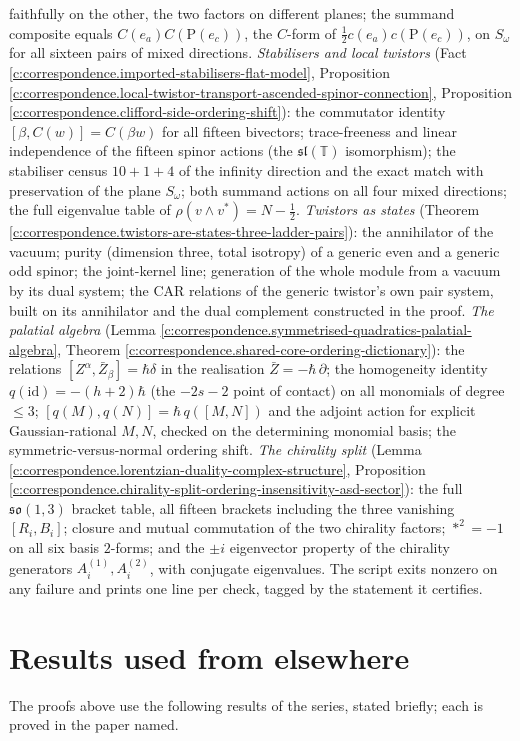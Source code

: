 \documentclass[11pt]{article}
\theoremstyle{definition}
\theoremstyle{plain}
\providecommand{\Som}{}\renewcommand{\Som}{S_\omega}
\providecommand{\T}{}\renewcommand{\T}{\mathbb{T}}
\begin{document}
faithfully on the other, the two factors on different planes; the summand composite equals $C(e_a)C(\mathrm{P}(e_c))$, the $C$-form of $\tfrac12 c(e_a)c(\mathrm{P}(e_c))$, on $\Som$ for all sixteen pairs of mixed directions. \emph{Stabilisers and local twistors} (Fact \ref{c:correspondence.imported-stabilisers-flat-model}, Proposition \ref{c:correspondence.local-twistor-transport-ascended-spinor-connection}, Proposition \ref{c:correspondence.clifford-side-ordering-shift}): the commutator identity $[\beta, C(w)] = C(\beta w)$ for all fifteen bivectors; trace-freeness and linear independence of the fifteen spinor actions (the $\mathfrak{sl}(\T)$ isomorphism); the stabiliser census $10 + 1 + 4$ of the infinity direction and the exact match with preservation of the plane $\Som$; both summand actions on all four mixed directions; the full eigenvalue table of $\rho(v\wedge v^*) = N - \tfrac12$. \emph{Twistors as states} (Theorem \ref{c:correspondence.twistors-are-states-three-ladder-pairs}): the annihilator of the vacuum; purity (dimension three, total isotropy) of a generic even and a generic odd spinor; the joint-kernel line; generation of the whole module from a vacuum by its dual system; the CAR relations of the generic twistor's own pair system, built on its annihilator and the dual complement constructed in the proof. \emph{The palatial algebra} (Lemma \ref{c:correspondence.symmetrised-quadratics-palatial-algebra}, Theorem \ref{c:correspondence.shared-core-ordering-dictionary}): the relations $[Z^\alpha, \bar Z_\beta] = \hbar\delta$ in the realisation $\bar Z = -\hbar\,\partial$; the homogeneity identity $q(\mathrm{id}) = -(h+2)\hbar$ (the $-2s-2$ point of contact) on all monomials of degree $\le 3$; $[q(M), q(N)] = \hbar\,q([M,N])$ and the adjoint action for explicit Gaussian-rational $M, N$, checked on the determining monomial basis; the symmetric-versus-normal ordering shift. \emph{The chirality split} (Lemma \ref{c:correspondence.lorentzian-duality-complex-structure}, Proposition \ref{c:correspondence.chirality-split-ordering-insensitivity-asd-sector}): the full $\mathfrak{so}(1,3)$ bracket table, all fifteen brackets including the three vanishing $[R_i, B_i]$; closure and mutual commutation of the two chirality factors; $\ast^2 = -1$ on all six basis $2$-forms; and the $\pm i$ eigenvector property of the chirality generators $A^{(1)}_i, A^{(2)}_i$, with conjugate eigenvalues. The script exits nonzero on any failure and prints one line per check, tagged by the statement it certifies.

\section{Results used from elsewhere}
The proofs above use the following results of the series, stated briefly; each is proved in the paper named.
\end{document}
